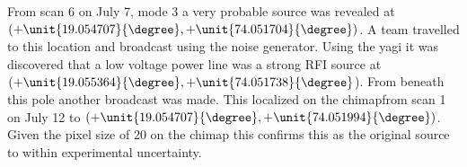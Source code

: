 \documentclass[a4paper,12pt]{article}
\begin{document}
                                                                                                                                                                                                                                                                                                                                                                                                                                                                                                                                                                                                                                                                                                                                                                                                                                                                                                                                                                                                                                                                                                                                                                                                                                                                                                                                                                                                                                                                                                                                                                                                                                                                                                                                                                                                                                                      From  scan 6 on July 7, mode 3 a very probable source was revealed at $(+\unit{19.054707}{\degree},+\unit{74.051704}{\degree})$. A team travelled to this location and broadcast using the noise generator. Using the yagi it was discovered that a low voltage power line was a strong RFI source at $(+\unit{19.055364}{\degree},+\unit{74.051738}{\degree}$). From beneath this pole another broadcast was made. This localized on the chimapfrom scan 1 on July 12 to $(+\unit{19.054707}{\degree},+\unit{74.051994}{\degree})$. Given the pixel size of \unit{20}{\metre} on the chimap this confirms this as the original source to within experimental uncertainty.
\end{document}
